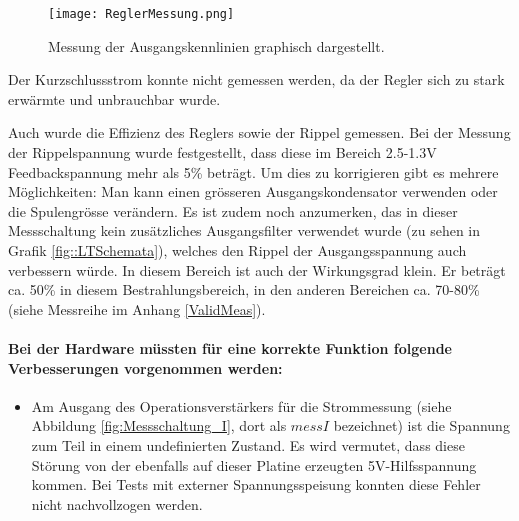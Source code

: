 \begin{figure}[h]
\texttt{[image: ReglerMessung.png]}%
\caption{Messung der Ausgangskennlinien graphisch dargestellt.}
\label{fig::Reglermessung}
\end{figure}

Der Kurzschlussstrom konnte nicht gemessen werden, da der Regler sich zu stark erwärmte und unbrauchbar wurde.

Auch wurde die Effizienz des Reglers sowie der Rippel gemessen.
Bei der Messung der Rippelspannung wurde festgestellt, dass diese im Bereich 2.5-1.3V Feedbackspannung mehr als 5\% beträgt.
Um dies zu korrigieren gibt es mehrere Möglichkeiten: Man kann einen grösseren Ausgangskondensator verwenden oder die Spulengrösse verändern. Es ist zudem noch anzumerken, das in dieser Messschaltung kein zusätzliches Ausgangsfilter verwendet wurde (zu sehen in Grafik \ref{fig::LTSchemata}), welches den Rippel der Ausgangsspannung auch verbessern würde. In diesem Bereich ist auch der Wirkungsgrad klein. Er beträgt ca. 50\% in diesem Bestrahlungsbereich, in den anderen Bereichen ca. 70-80\% (siehe Messreihe im Anhang \ref{ValidMeas}).

\paragraph{Bei der Hardware müssten für eine korrekte Funktion folgende Verbesserungen vorgenommen werden:}
\begin{itemize}
	\item Am Ausgang des Operationsverstärkers für die Strommessung (siehe Abbildung \ref{fig:Messschaltung_I}, dort als $messI$ bezeichnet) ist die Spannung zum Teil in einem undefinierten Zustand. Es wird vermutet, dass diese Störung von der ebenfalls auf dieser Platine erzeugten 5V-Hilfsspannung kommen. Bei Tests mit externer Spannungsspeisung konnten diese Fehler nicht nachvollzogen werden.
\end{itemize}